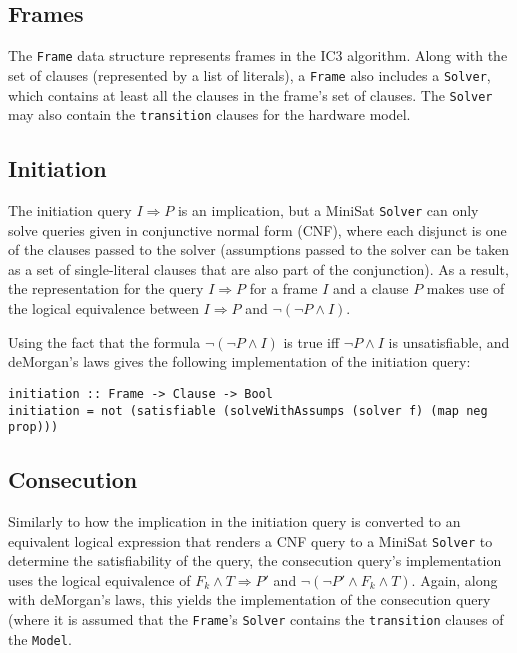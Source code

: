 \documentclass[12pt,a4paper,twoside,openright]{report}
\begin{document}
{\subsection{Frames}
The \verb,Frame, data structure represents frames in the IC3 algorithm.
Along with the set of clauses (represented by a list of literals), a \verb,Frame, also includes
a \verb,Solver,, which contains at least all the clauses in the frame's set of clauses. The
\verb,Solver, may also contain the \verb,transition, clauses for the hardware model.

\subsection{Initiation}

The initiation query $I \Rightarrow P$ is an implication, but a MiniSat \verb,Solver, can only
solve queries given in conjunctive normal form (CNF), where each disjunct is one of the clauses passed
to the solver (assumptions passed to the solver can be taken as a set of single-literal clauses
that are also part of the conjunction). As a result, the representation for the query
$I \Rightarrow P$ for a frame $I$ and a clause $P$ makes use of the logical equivalence between
$I \Rightarrow P$ and $\neg (\neg P \wedge I)$.

Using the fact that the formula $\neg (\neg P \wedge I)$ is true iff $\neg P \wedge I$ is unsatisfiable,
and deMorgan's laws gives the following implementation of the initiation query:

\begin{verbatim}
initiation :: Frame -> Clause -> Bool
initiation = not (satisfiable (solveWithAssumps (solver f) (map neg prop)))
\end{verbatim}

\subsection{Consecution}

Similarly to how the implication in the initiation query is converted to an equivalent logical
expression that renders a CNF query to a MiniSat \verb,Solver, to determine the satisfiability
of the query, the consecution query's implementation uses the logical equivalence of
$F_k \wedge T \Rightarrow P'$ and $\neg (\neg P' \wedge F_k \wedge T)$. Again, along with deMorgan's
laws, this yields the implementation of the consecution query (where it is assumed that the
\verb,Frame,'s \verb,Solver, contains the \verb,transition, clauses of the \verb,Model,.

}
\end{document}
